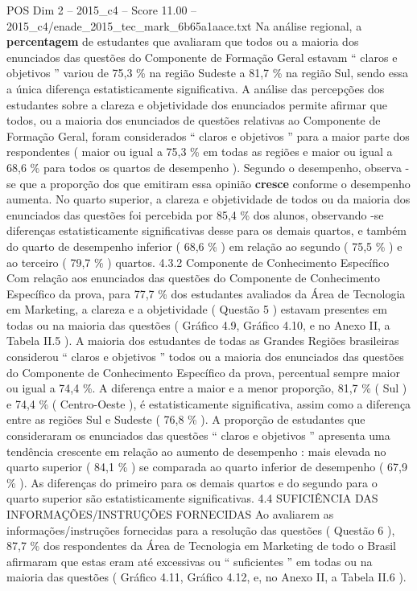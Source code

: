 \begin{textsample}{POS Dim 2 – 2015\_c4 – Score 11.00 – 2015\_c4/enade\_2015\_tec\_mark\_6b65a1aace.txt}
Na análise regional, a \textbf{percentagem} de estudantes que avaliaram que todos ou a maioria dos enunciados das questões do Componente de Formação Geral estavam “ claros e objetivos ” variou de 75,3 \% na região Sudeste a 81,7 \% na região Sul, sendo essa a única diferença estatisticamente significativa.
A análise das percepções dos estudantes sobre a clareza e objetividade dos enunciados permite afirmar que todos, ou a maioria dos enunciados de questões relativas ao Componente de Formação Geral, foram considerados “ claros e objetivos ” para a maior parte dos respondentes ( maior ou igual a 75,3 \% em todas as regiões e maior ou igual a 68,6 \% para todos os quartos de desempenho ).
Segundo o desempenho, observa -se que a proporção dos que emitiram essa opinião \textbf{cresce} conforme o desempenho aumenta.
No quarto superior, a clareza e objetividade de todos ou da maioria dos enunciados das questões foi percebida por 85,4 \% dos alunos, observando -se diferenças estatisticamente significativas desse para os demais quartos, e também do quarto de desempenho inferior ( 68,6 \% ) em relação ao segundo ( 75,5 \% ) e ao terceiro ( 79,7 \% ) quartos. 4.3.2 Componente de Conhecimento Específico Com relação aos enunciados das questões do Componente de Conhecimento Específico da prova, para 77,7 \% dos estudantes avaliados da Área de Tecnologia em Marketing, a clareza e a objetividade ( Questão 5 ) estavam presentes em todas ou na maioria das questões ( Gráfico 4.9, Gráfico 4.10, e no Anexo II, a Tabela II.5 ).
A maioria dos estudantes de todas as Grandes Regiões brasileiras considerou “ claros e objetivos ” todos ou a maioria dos enunciados das questões do Componente de Conhecimento Específico da prova, percentual sempre maior ou igual a 74,4 \%.
A diferença entre a maior e a menor proporção, 81,7 \% ( Sul ) e 74,4 \% ( Centro-Oeste ), é estatisticamente significativa, assim como a diferença entre as regiões Sul e Sudeste ( 76,8 \% ).
A proporção de estudantes que consideraram os enunciados das questões “ claros e objetivos ” apresenta uma tendência crescente em relação ao aumento de desempenho : mais elevada no quarto superior ( 84,1 \% ) se comparada ao quarto inferior de desempenho ( 67,9 \% ).
As diferenças do primeiro para os demais quartos e do segundo para o quarto superior são estatisticamente significativas. 4.4 SUFICIÊNCIA DAS INFORMAÇÕES/INSTRUÇÕES FORNECIDAS Ao avaliarem as informações/instruções fornecidas para a resolução das questões ( Questão 6 ), 87,7 \% dos respondentes da Área de Tecnologia em Marketing de todo o Brasil afirmaram que estas eram até excessivas ou “ suficientes ” em todas ou na maioria das questões ( Gráfico 4.11, Gráfico 4.12, e, no Anexo II, a Tabela II.6 ).

\end{textsample}
